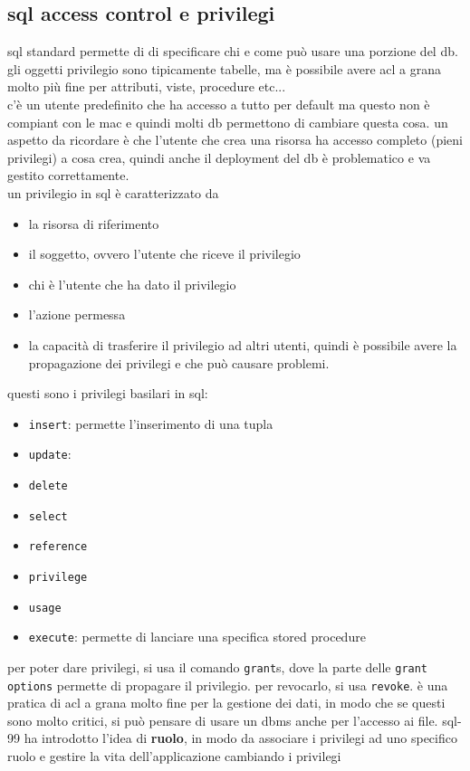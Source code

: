 \documentclass[12pt, oneside]{extbook} %
\begin{document}
\subsection{sql access control e privilegi}
sql standard permette di di specificare chi e come può usare una porzione del db. gli oggetti privilegio sono tipicamente tabelle, ma è possibile avere acl a grana molto più fine per attributi, viste, procedure etc...\\c'è un utente predefinito che ha accesso a tutto per default ma questo non è compiant con le mac e quindi molti db permettono di cambiare questa cosa. un aspetto da ricordare è che l'utente che crea una risorsa ha accesso completo (pieni privilegi) a cosa crea, quindi anche il deployment del db è problematico e va gestito correttamente.\\ un privilegio in sql è caratterizzato da 
\begin{itemize}
	\item la risorsa di riferimento
	\item il soggetto, ovvero l'utente che riceve il privilegio
	\item chi è l'utente che ha dato il privilegio
	\item l'azione permessa
	\item la capacità di trasferire il privilegio ad altri utenti, quindi è possibile avere la propagazione dei privilegi e che può causare problemi.
\end{itemize}
questi sono i privilegi basilari in sql:
\begin{itemize}
	\item \texttt{insert}: permette l'inserimento di una tupla
	\item \texttt{update}: 
	\item \texttt{delete}
	\item \texttt{select}
	\item \texttt{reference}
	\item \texttt{privilege}
	\item \texttt{usage}
	\item \texttt{execute}: permette di lanciare una specifica stored procedure
\end{itemize}
per poter dare privilegi, si usa il comando \texttt{grant}s, dove la parte delle \texttt{grant options} permette di propagare il privilegio. per revocarlo, si usa \texttt{revoke}. è una pratica di acl a grana molto fine per la gestione dei dati, in modo che se questi sono molto critici, si può pensare di usare un dbms anche per l'accesso ai file. sql-99 ha introdotto l'idea di \textbf{ruolo}, in modo da associare i privilegi ad uno specifico ruolo e gestire la vita dell'applicazione cambiando i privilegi
\end{document}
